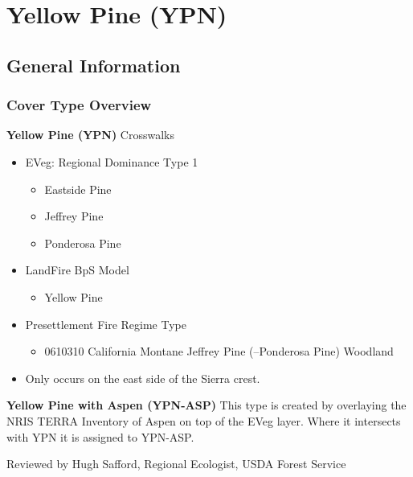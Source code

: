 \newpage
\section{Yellow Pine (YPN)}

\subsection*{General Information}

\subsubsection{Cover Type Overview}

\textbf{Yellow Pine (YPN)}
\newline
Crosswalks
\begin{itemize}
	\item EVeg: Regional Dominance Type 1
	\begin{itemize}
		\item Eastside Pine
		\item Jeffrey Pine
		\item Ponderosa Pine
	\end{itemize}

	\item LandFire BpS Model
	\begin{itemize}
		\item Yellow Pine
	\end{itemize}

	\item Presettlement Fire Regime Type
	\begin{itemize}
		\item 0610310 California Montane Jeffrey Pine (–Ponderosa Pine) Woodland
	\end{itemize}

	\item Only occurs on the east side of the Sierra crest.
\end{itemize}

\textbf{Yellow Pine with Aspen (YPN-ASP)}
\newline
This type is created by overlaying the NRIS TERRA Inventory of Aspen on top of the EVeg layer. Where it intersects with YPN it is assigned to YPN-ASP.

\noindent Reviewed by Hugh Safford, Regional Ecologist, USDA Forest Service


